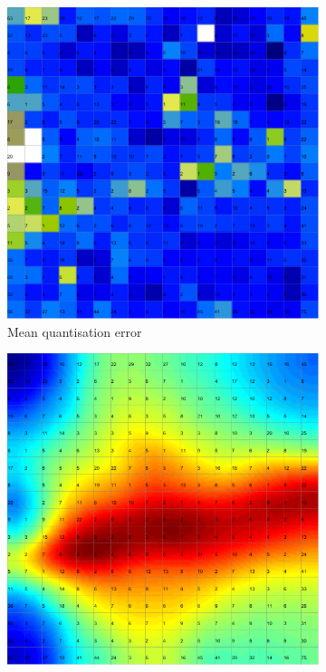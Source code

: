 \documentclass{acm_proc_article-sp}
\begin{document}
\begin{figure}
\begin{subfigure}[b]{0.45\linewidth}
    \includegraphics[width=\linewidth]{img/wine-mid-mean-quant-error}
    \caption{Mean quantisation error}
    \label{fig:wine-mid-mean-quant-error}
\end{subfigure}
\begin{subfigure}[b]{0.45\linewidth}
    \includegraphics[width=\linewidth]{img/wine-mid-p-matrix}

\end{subfigure}
\end{figure}
\end{document}
